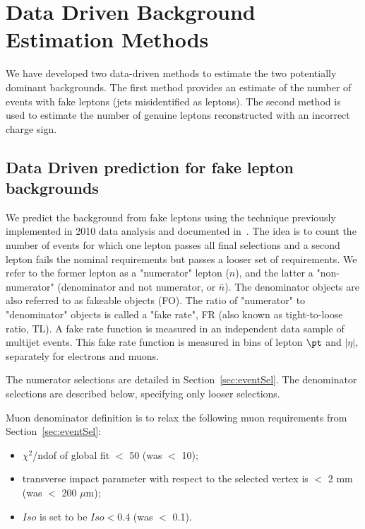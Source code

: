\section{Data Driven Background Estimation Methods}
\label{sec:datadriven}

We have developed two data-driven methods to 
estimate the two potentially dominant backgrounds.
The first method provides an estimate of the number of events with fake leptons (jets misidentified as leptons).
The second method is used to estimate the number of genuine leptons reconstructed with an incorrect charge sign.

\subsection{Data Driven prediction for fake lepton backgrounds}
\label{sec:fakes}

We predict the background from fake leptons using the technique previously implemented in 2010 data analysis
and documented in~\cite{ref:fakeRateNote}.
The idea is to count the number of events for which one lepton passes all final selections and a second lepton
fails the nominal requirements but passes a looser set of requirements. 
We refer to the former lepton as a "numerator" lepton ($n$),
and the latter a "non-numerator" (denominator and not numerator, or $\bar{n}$).
The denominator objects are also referred to as fakeable objects (FO).
The ratio of "numerator" to "denominator" objects is called a "fake rate",
 FR (also known as tight-to-loose ratio, TL).  
A fake rate function is measured in an independent data sample of multijet events.
This fake rate function is measured in bins of lepton $\pt$ and $|\eta |$,
separately for electrons and muons. 

The numerator selections are detailed in Section~\ref{sec:eventSel}. 
The denominator selections are described below, specifying only looser selections.

Muon denominator definition is to relax the following muon requirements from
Section~\ref{sec:eventSel}:
\begin{itemize}
\item $\chi^2$/ndof of global fit $<$ 50 (was $<$ 10);
\item transverse impact parameter with respect to the selected vertex is
$<$ 2 mm (was $<$ 200 $\mu$m);
\item $Iso$ is set to be $Iso < 0.4$  (was $<$ 0.1).
\end{itemize}

